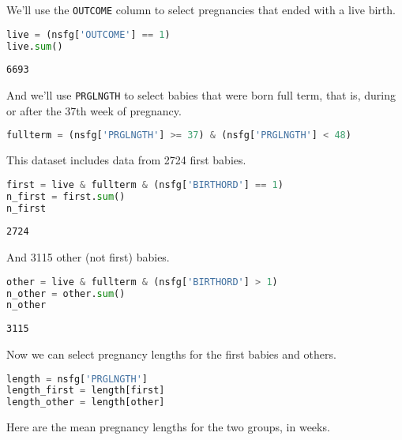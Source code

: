 We'll use the \passthrough{\lstinline!OUTCOME!} column to select
pregnancies that ended with a live birth.

\begin{lstlisting}[language=Python,style=source]
live = (nsfg['OUTCOME'] == 1)
live.sum()
\end{lstlisting}

\begin{lstlisting}[style=output]
6693
\end{lstlisting}

And we'll use \passthrough{\lstinline!PRGLNGTH!} to select babies that
were born full term, that is, during or after the 37th week of
pregnancy.

\begin{lstlisting}[language=Python,style=source]
fullterm = (nsfg['PRGLNGTH'] >= 37) & (nsfg['PRGLNGTH'] < 48)
\end{lstlisting}

This dataset includes data from 2724 first babies.

\begin{lstlisting}[language=Python,style=source]
first = live & fullterm & (nsfg['BIRTHORD'] == 1)
n_first = first.sum()
n_first
\end{lstlisting}

\begin{lstlisting}[style=output]
2724
\end{lstlisting}

\pagebreak

And 3115 other (not first) babies.

\begin{lstlisting}[language=Python,style=source]
other = live & fullterm & (nsfg['BIRTHORD'] > 1)
n_other = other.sum()
n_other
\end{lstlisting}

\begin{lstlisting}[style=output]
3115
\end{lstlisting}

Now we can select pregnancy lengths for the first babies and others.

\begin{lstlisting}[language=Python,style=source]
length = nsfg['PRGLNGTH']
length_first = length[first]
length_other = length[other]
\end{lstlisting}

Here are the mean pregnancy lengths for the two groups, in weeks.

